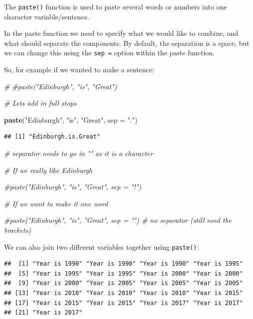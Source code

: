 \documentclass[12pt,]{krantz}
\makeatletter
\newenvironment{Shaded}{\begin{snugshade}}{\end{snugshade}}
\newcommand{\CommentTok}[1]{\textcolor[rgb]{0.56,0.35,0.01}{\textit{#1}}}
\newcommand{\DataTypeTok}[1]{\textcolor[rgb]{0.13,0.29,0.53}{#1}}
\newcommand{\KeywordTok}[1]{\textcolor[rgb]{0.13,0.29,0.53}{\textbf{#1}}}
\newcommand{\NormalTok}[1]{#1}
\newcommand{\OperatorTok}[1]{\textcolor[rgb]{0.81,0.36,0.00}{\textbf{#1}}}
\newcommand{\StringTok}[1]{\textcolor[rgb]{0.31,0.60,0.02}{#1}}
\newenvironment{kframe}{%
\medskip{}
\setlength{\fboxsep}{.8em}
 \def\at@end@of@kframe{}%
 \ifinner\ifhmode%
  \def\at@end@of@kframe{\end{minipage}}%
  \begin{minipage}{\columnwidth}%
 \fi\fi%
 \def\FrameCommand##1{\hskip\@totalleftmargin \hskip-\fboxsep
 \colorbox{shadecolor}{##1}\hskip-\fboxsep
     \hskip-\linewidth \hskip-\@totalleftmargin \hskip\columnwidth}%
 \MakeFramed {\advance\hsize-\width
   \@totalleftmargin\z@ \linewidth\hsize
   \@setminipage}}%
 {\par\unskip\endMakeFramed%
 \at@end@of@kframe}
\renewenvironment{Shaded}{\begin{kframe}}{\end{kframe}}
\theoremstyle{definition}
\theoremstyle{definition}
\theoremstyle{definition}
\theoremstyle{remark}
\makeatother
\begin{document}
The \texttt{paste()} function is used to paste several words or numbers
into one character variable/sentence.

In the paste function we need to specify what we would like to combine,
and what should separate the components. By default, the separation is a
space, but we can change this using the \texttt{sep\ =} option within
the paste function.

So, for example if we wanted to make a sentence:

\begin{Shaded}
\begin{Highlighting}[]
\CommentTok{# }
\CommentTok{#paste("Edinburgh", "is", "Great")}

\CommentTok{# Lets add in full stops}


\KeywordTok{paste}\NormalTok{(}\StringTok{"Edinburgh"}\NormalTok{, }\StringTok{"is"}\NormalTok{, }\StringTok{"Great"}\NormalTok{, }\DataTypeTok{sep =} \StringTok{"."}\NormalTok{)}
\end{Highlighting}
\end{Shaded}

\begin{verbatim}
## [1] "Edinburgh.is.Great"
\end{verbatim}

\begin{Shaded}
\begin{Highlighting}[]
\CommentTok{# separator needs to go in "" as it is a character}


\CommentTok{# If we really like Edinburgh}

\CommentTok{#paste("Edinburgh", "is", "Great", sep = "!")}

\CommentTok{# If we want to make it one word}

\CommentTok{#paste("Edinburgh", "is", "Great", sep = "") # no separator (still need the brackets)}
\end{Highlighting}
\end{Shaded}

We can also join two different variables together using
\texttt{paste()}:

\begin{Shaded}
\end{Shaded}

\begin{verbatim}
##  [1] "Year is 1990" "Year is 1990" "Year is 1990" "Year is 1995"
##  [5] "Year is 1995" "Year is 1995" "Year is 2000" "Year is 2000"
##  [9] "Year is 2000" "Year is 2005" "Year is 2005" "Year is 2005"
## [13] "Year is 2010" "Year is 2010" "Year is 2010" "Year is 2015"
## [17] "Year is 2015" "Year is 2015" "Year is 2017" "Year is 2017"
## [21] "Year is 2017"
\end{verbatim}
\end{document}
